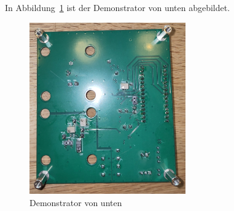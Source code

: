 In Abbildung~\ref{fig:photo_demonstrator_bottom} ist der Demonstrator von unten abgebildet.

\begin{figure}[H]
    \centering
    \includegraphics[width=0.6\textwidth]{graphics/photo_demonstrator_bottom.jpg}
    \caption{Demonstrator von unten}\label{fig:photo_demonstrator_bottom}
\end{figure}

